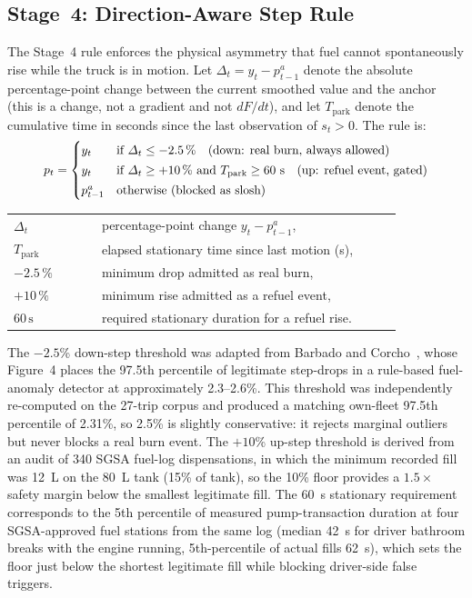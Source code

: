 \subsection{Stage~4: Direction-Aware Step Rule}
\label{sec:fuel_direction_aware}

The Stage~4 rule enforces the physical asymmetry that fuel cannot spontaneously rise while the truck is in motion. Let $\Delta_t = y_t - p^{a}_{t-1}$ denote the absolute percentage-point change between the current smoothed value and the anchor (this is a change, not a gradient and not $dF/dt$), and let $T_{\mathrm{park}}$ denote the cumulative time in seconds since the last observation of $s_t > 0$. The rule is:
\begin{equation}
\resizebox{0.88\linewidth}{!}{$\displaystyle
p_t =
\begin{cases}
y_t & \text{if } \Delta_t \leq -2.5\,\% \quad\text{(down: real burn, always allowed)} \\[2pt]
y_t & \text{if } \Delta_t \geq +10\,\%\ \text{and}\ T_{\mathrm{park}} \geq 60\text{ s} \quad\text{(up: refuel event, gated)} \\[2pt]
p^{a}_{t-1} & \text{otherwise (blocked as slosh)}
\end{cases}
$}
\label{eq:direction_aware}
\end{equation}
\noindent\begin{tabular}{@{}p{0.20\linewidth}@{\quad}p{0.68\linewidth}@{}}
$\Delta_t$ & percentage-point change $y_t - p^{a}_{t-1}$, \\
$T_{\mathrm{park}}$ & elapsed stationary time since last motion (s), \\
$-2.5\,\%$ & minimum drop admitted as real burn, \\
$+10\,\%$ & minimum rise admitted as a refuel event, \\
$60\,\text{s}$ & required stationary duration for a refuel rise.
\end{tabular}

\vspace{0.5em}

The $-2.5$\% down-step threshold was adapted from Barbado and Corcho~\cite{barbado2022interpretable}, whose Figure~4 places the 97.5th percentile of legitimate step-drops in a rule-based fuel-anomaly detector at approximately 2.3--2.6\%. This threshold was independently re-computed on the 27-trip corpus and produced a matching own-fleet 97.5th percentile of 2.31\%, so 2.5\% is slightly conservative: it rejects marginal outliers but never blocks a real burn event. The $+10$\% up-step threshold is derived from an audit of 340 SGSA fuel-log dispensations, in which the minimum recorded fill was 12~L on the 80~L tank (15\% of tank), so the 10\% floor provides a $1.5\times$ safety margin below the smallest legitimate fill. The 60~s stationary requirement corresponds to the 5th percentile of measured pump-transaction duration at four SGSA-approved fuel stations from the same log (median 42~s for driver bathroom breaks with the engine running, 5th-percentile of actual fills 62~s), which sets the floor just below the shortest legitimate fill while blocking driver-side false triggers.

